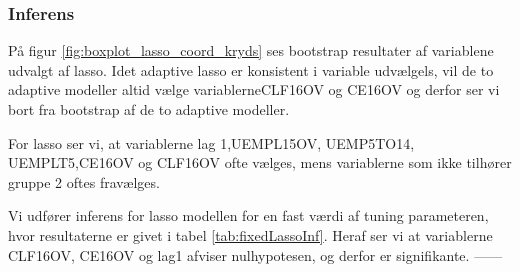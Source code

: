 \subsubsection*{Inferens}
På figur \ref{fig:boxplot_lasso_coord_kryds} ses bootstrap resultater af variablene udvalgt af lasso.
Idet adaptive lasso er konsistent i variable udvælgels, vil de to adaptive modeller altid vælge variablerne\textcolor{blue3}{CLF16OV} og \textcolor{blue3}{CE16OV} og derfor ser vi bort fra bootstrap af de to adaptive modeller. 

For lasso ser vi, at variablerne \textcolor{blue3}{lag 1},\textcolor{blue3}{UEMPL15OV}, \textcolor{blue3}{UEMP5TO14}, \textcolor{blue3}{UEMPLT5},\textcolor{blue3}{CE16OV} og \textcolor{blue3}{CLF16OV} ofte vælges, mens variablerne som ikke tilhører gruppe 2 oftes fravælges.

%

%

Vi udfører inferens for lasso modellen for en fast værdi af tuning parameteren, hvor resultaterne er givet  i tabel \ref{tab:fixedLassoInf}.
Heraf ser vi at variablerne \textcolor{blue3}{CLF16OV}, \textcolor{blue3}{CE16OV} og \textcolor{blue3}{lag1} afviser nulhypotesen, og derfor er signifikante. ------



%

%

\newpage
%
%

 


\newpage